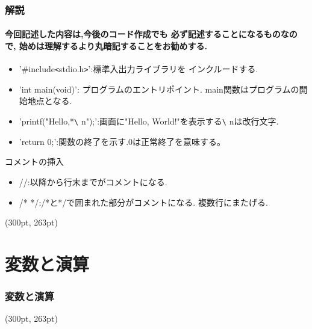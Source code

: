 \documentclass[dvipdfmx]{beamer}
\begin{document}
\begin{frame}[t, fragile, label=11]
    \frametitle{解説}
    \framesubtitle{今回記述した内容は,今後のコード作成でも
        必ず記述することになるものなので,
        始めは理解するより丸暗記することをお勧めする.}
    \begin{itemize}
        \item '\#include\verb|<|stdio.h\verb|>|':標準入出力ライブラリを
                インクルードする.
        \item 'int main(void)': プログラムのエントリポイント.
                main関数はプログラムの開始地点となる.
        \item 'printf("Hello,*\verb|\| n");':画面に"Hello, 
                World!"を表示する\verb|\| nは改行文字.
        \item 'return 0;':関数の終了を示す.0は正常終了を意味する。
    \end{itemize}
    \begin{itembox}[l]{コメントの挿入}
        \begin{itemize}
            \item //:以降から行末までがコメントになる.
            \item /* */:/*と*/で囲まれた部分がコメントになる.
                    複数行にまたげる.
        \end{itemize}
    \end{itembox}
    \begin{textblock*}{0.3\linewidth}(300pt, 263pt)
    \hyperlink{10}{}
    \space
    \hyperlink{12}{}
    \end{textblock*}
\end{frame}

\section{変数と演算}
\begin{frame}[label=12]
    \frametitle{変数と演算}
    \tableofcontents[sections={2,6}]
    \begin{textblock*}{0.3\linewidth}(300pt, 263pt)
    \hyperlink{11}{}
    \space
    \hyperlink{13}{}
    \end{textblock*}
\end{frame}
\end{document}
